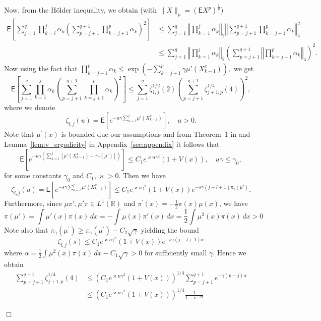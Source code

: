 \documentclass[bj]{imsart}
\newcommand{\proofendsign}{$\Box$}
\newenvironment{proof}{{\noindent \bf Proof }}
 {{\hspace*{\fill}\proofendsign\par\bigskip}}
\begin{document}
\begin{proof}
Now, from the H\"older inequality, we obtain (with $\|X\|_p = (\mathsf{E}X^p)^{\frac{1}{p}}$)
\begin{align*}
\mathsf{E}\left[\sum_{j=1}^{q}\prod_{k=l}^{j}\alpha_{k}\left( \sum_{p=j+1}^{q+1}\prod_{k=j+1}^{p}\alpha_{k}\right)^{2}\right] & \leq\sum_{j=1}^{q}\left\Vert \prod_{k=1}^{j}\alpha_{k}\right\Vert _{2}\left\Vert \sum_{p=j+1}^{q+1} \prod_{k=j+1}^{p}\alpha_{k}\right\Vert _{4}^{2}\\
 & \leq\sum_{j=1}^{q} \left\Vert \prod_{k=1}^{j}\alpha_{k}\right\Vert _{2}\left(\sum_{p=j+1}^{q+1}\left\Vert \prod_{k=j+1}^{p}\alpha_{k}\right\Vert _{4}\right)^{2}.
\end{align*}
Now using the fact that $\prod\limits_{k=j+1}^{p}\alpha_{k} \leq \exp\left(-\sum\limits_{k=j+1}^{p}\gamma\mu'(X_{k-1}^x)\right),$
we get
\[
\mathsf{E}\left[\sum_{j=1}^{q}\prod_{k=1}^{j}\alpha_{k}\left(\sum_{p=j+1}^{q+1}\prod_{k=j+1}^{p}\alpha_{k}\right)^{2}\right]\leq\sum_{j=1}^{q} \zeta^{1/2}_{1,j}(2) \left(\sum_{p=j+1}^{q+1} \zeta^{1/4}_{j+1,p}(4)\right)^{2},
\]
where we denote
\[
\zeta_{l,j}(u)=\mathsf{E}\left[e^{-u\gamma\sum_{k=l}^{j}\mu'(X^x_{k-1})}\right],\quad u>0.
\]
Note that $\mu^{\prime}(x)$ is bounded due  our assumptions and from Theorem~1 in \cite{delyon1999small} and Lemma~\ref{lem:v_ergodicity} in Appendix~\ref{sec:appendix} it follows that
\[
\mathsf{E}\left[e^{-u\gamma\left(\sum_{k=l}^{j}[\mu'(X^x_{k-1})-\pi_\gamma(\mu')]\right)}\right]\leq C_1e^{\varkappa n\gamma^2}(1+V(x)),\quad u\gamma\leq \gamma_0,
\]
for some constants $\gamma_0$ and $C_1,\varkappa>0$. Then we have
\[
\zeta_{l,j}(u)=\mathsf{E}\left[e^{-s\gamma\sum_{k=l}^{j}\mu'(X^x_{k-1})}\right]\leq  C_1 e^{\varkappa n\gamma^2}(1+V(x))e^{-s\gamma (j-l+1)\pi_\gamma(\mu')}.
\]
Furthermore, since $\mu\pi',\mu'\pi\in L^{1}(\mathbb{R})$ and $\pi^{\prime}(x) = -\frac{1}{2}\pi(x)\mu(x)$, we have
\[
\pi(\mu')=\int\mu'(x)\pi(x)\,dx=-\int\mu(x)\pi'(x)\,dx=\frac{1}{2}\int\mu^{2}(x)\pi(x)\,dx>0
\]
Note also that \(\pi_\gamma(\mu^{\prime}) \geq \pi_\gamma(\mu^{\prime}) - C_2\sqrt{\gamma}\)
yielding the bound
\[
\zeta_{l,j}(s) \leq  C_1e^{\varkappa n\gamma^2}(1+V(x))e^{-s\gamma(j-l+1)\alpha}
\]
where $ \alpha = \frac{1}{2}\int \mu^2(x)\pi(x)\,dx - C_1\sqrt{\gamma} > 0$ for sufficiently small $\gamma$. Hence we obtain
\begin{align*}
\sum_{p=j+1}^{q+1} \zeta^{1/4}_{j+1,p}(4) &\leq (C_1e^{\varkappa n\gamma^2}(1+V(x)))^{1/4}\sum_{p=j+1}^{q+1}e^{-\gamma(p-j)\alpha} 
\\
&\leq  (C_1e^{\varkappa n\gamma^2}(1+V(x)))^{1/4}\frac{1}{1-e^{- \gamma\alpha}}
\end{align*}

\end{proof}
\end{document}
